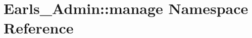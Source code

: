 \hypertarget{namespaceEarls__Admin_1_1manage}{
\section{Earls\_\-Admin::manage Namespace Reference}
\label{namespaceEarls__Admin_1_1manage}
}


